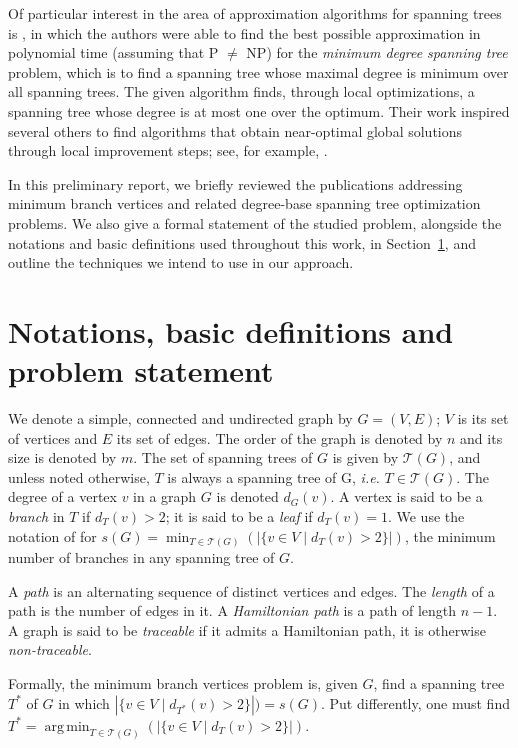 \documentclass[12pt]{article}
\DeclareMathOperator*{\argmin}{arg\,min}
\begin{document}
Of particular interest in the area of approximation algorithms for spanning trees is \cite{furer1992}, in which the authors were able to find the best possible approximation in polynomial time (assuming that P $\neq$ NP) for the \emph{minimum degree spanning tree} problem, which is to find a spanning tree whose maximal degree is minimum over all spanning trees.
The given algorithm finds, through local optimizations, a spanning tree whose degree is at most one over the optimum. 
Their work inspired several others to find algorithms that obtain near-optimal global solutions through local improvement steps; see, for example, \cite{salamon2010, lu1996, chimani2015}.

In this preliminary report, we briefly reviewed the publications addressing minimum branch vertices and related degree-base spanning tree optimization problems.
We also give a formal statement of the studied problem, alongside the notations and basic definitions used throughout this work, in Section~\ref{sec:notations}, and outline the techniques we intend to use in our approach.

\section{Notations, basic definitions and problem statement} \label{sec:notations}

We denote a simple, connected and undirected graph by $G = (V, E)$; $V$ is its set of vertices and $E$ its set of edges.
The order of the graph is denoted by $n$ and its size is denoted by $m$.
The set of spanning trees of $G$ is given by $\mathcal{T}(G)$, and unless noted otherwise, $T$ is always a spanning tree of G, \emph{i.e.} $T \in \mathcal{T}(G)$.
The degree of a vertex $v$ in a graph $G$ is denoted $d_G(v)$.
A vertex is said to be a \emph{branch} in $T$ if $d_T(v) > 2$; it is said to be a \emph{leaf} if $d_T(v) = 1$.
We use the notation of \cite{gargano2004} for $s(G) = \min_{T \in \mathcal{T}(G)}(|\{v \in V \mid d_T(v) > 2 \}|)$, the minimum number of branches in any spanning tree of $G$.

A \emph{path} is an alternating sequence of distinct vertices and edges.
The \emph{length} of a path is the number of edges in it.
A \emph{Hamiltonian path} is a path of length $n - 1$.
A graph is said to be \emph{traceable} if it admits a Hamiltonian path, it is otherwise \emph{non-traceable}.

Formally, the minimum branch vertices problem is, given $G$, find a spanning tree $T^*$ of $G$ in which $|\{v \in V \mid d_{T^*}(v) > 2 \}|) = s(G)$.
Put differently, one must find $T^* = \argmin_{T \in \mathcal{T}(G)}(|\{ v \in V \mid d_T(v) > 2\}|)$.



\end{document}
